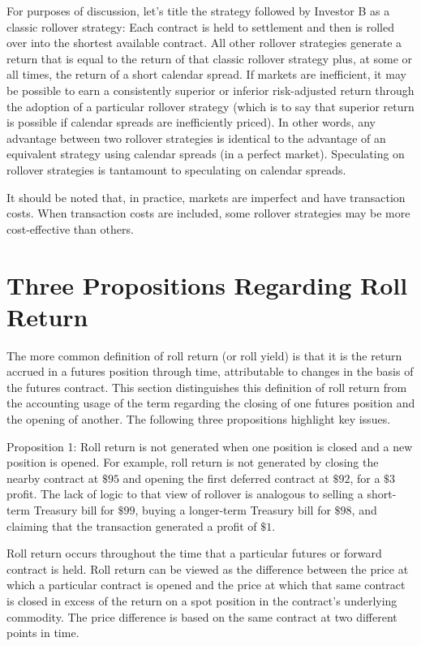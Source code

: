\documentclass[11pt]{article}
\begin{document}
For purposes of discussion, let's title the strategy followed by Investor B as a classic rollover strategy: Each contract is held to settlement and then is rolled over into the shortest available contract. All other rollover strategies generate a return that is equal to the return of that classic rollover strategy plus, at some or all times, the return of a short calendar spread. If markets are inefficient, it may be possible to earn a consistently superior or inferior risk-adjusted return through the adoption of a particular rollover strategy (which is to say that superior return is possible if calendar spreads are inefficiently priced). In other words, any advantage between two rollover strategies is identical to the advantage of an equivalent strategy using calendar spreads (in a perfect market). Speculating on rollover strategies is tantamount to speculating on calendar spreads.

It should be noted that, in practice, markets are imperfect and have transaction costs. When transaction costs are included, some rollover strategies may be more cost-effective than others.

\section*{Three Propositions Regarding Roll Return}
The more common definition of roll return (or roll yield) is that it is the return accrued in a futures position through time, attributable to changes in the basis of the futures contract. This section distinguishes this definition of roll return from the accounting usage of the term regarding the closing of one futures position and the opening of another. The following three propositions highlight key issues.

Proposition 1: Roll return is not generated when one position is closed and a new position is opened. For example, roll return is not generated by closing the nearby contract at $\$ 95$ and opening the first deferred contract at $\$ 92$, for a $\$ 3$ profit. The lack of logic to that view of rollover is analogous to selling a short-term Treasury bill for $\$ 99$, buying a longer-term Treasury bill for $\$ 98$, and claiming that the transaction generated a profit of $\$ 1$.

Roll return occurs throughout the time that a particular futures or forward contract is held. Roll return can be viewed as the difference between the price at which a particular contract is opened and the price at which that same contract is closed in excess of the return on a spot position in the contract's underlying commodity. The price difference is based on the same contract at two different points in time.
\end{document}
